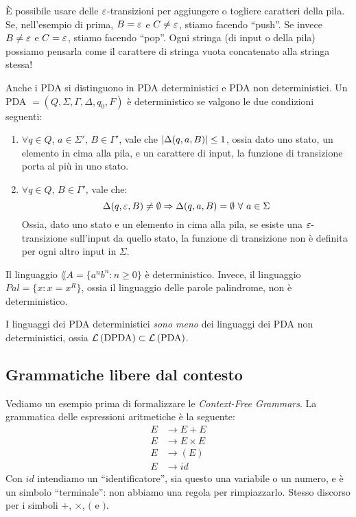 \`E possibile usare delle $\varepsilon$-transizioni per aggiungere o togliere caratteri della pila.
Se, nell'esempio di prima, $B = \varepsilon$ e $C \neq \varepsilon$, stiamo facendo ``push''.
Se invece $B \neq \varepsilon$ e $C = \varepsilon$, stiamo facendo ``pop''.
Ogni stringa (di input o della pila) possiamo pensarla come il carattere di stringa vuota concatenato alla stringa stessa!

Anche i PDA si distinguono in PDA deterministici e PDA non deterministici.
Un PDA $ = (Q, \Sigma, \Gamma, \Delta, q_0, F )$ \`e deterministico se valgono le due condizioni seguenti:
\begin{enumerate}
	\item $\forall q \in Q$, $a \in \Sigma'$, $B \in \Gamma'$, vale che $\left\lvert{\Delta(q,a,B)}\right\rvert \le 1$, ossia dato uno stato, un elemento in cima alla pila, e un carattere di input, la funzione di transizione porta al pi\`u in uno stato.
	\item $\forall q \in Q$, $B \in \Gamma'$, vale che:
	\[
	\Delta(q, \emptystring, B) \neq \emptyset \implies \Delta(q, a, B) = \emptyset \forall a \in \Sigma
	\]
	Ossia, dato uno stato e un elemento in cima alla pila, se esiste una $\varepsilon$-transizione sull'input da quello stato, la funzione di transizione non \`e definita per ogni altro input in $\Sigma$.
\end{enumerate}

Il linguaggio $\lang{A} = \{ a^n b^n : n \ge 0 \}$ \`e deterministico.
Invece, il linguaggio $Pal = \{ x : x = x^R \}$, ossia il linguaggio delle parole palindrome, non \`e deterministico.

I linguaggi dei PDA deterministici \emph{sono meno} dei linguaggi dei PDA non deterministici, ossia $\mathcal{L}\left( {\text{DPDA}} \right) \subset \mathcal{L}\left( {\text{PDA}} \right)$.

\subsection{Grammatiche libere dal contesto}

Vediamo un esempio prima di formalizzare le \emph{Context-Free Grammars}.
La grammatica delle espressioni aritmetiche \`e la seguente:
\begin{align*}
	E &\to E + E \\
	E &\to E \times E \\
	E &\to ( E ) \\
	E &\to id
\end{align*}
Con $id$ intendiamo un ``identificatore'', sia questo una variabile o un numero, e \`e un simbolo ``terminale'': non abbiamo una regola per rimpiazzarlo.
Stesso discorso per i simboli $+$, $\times$, $($ e $)$.

